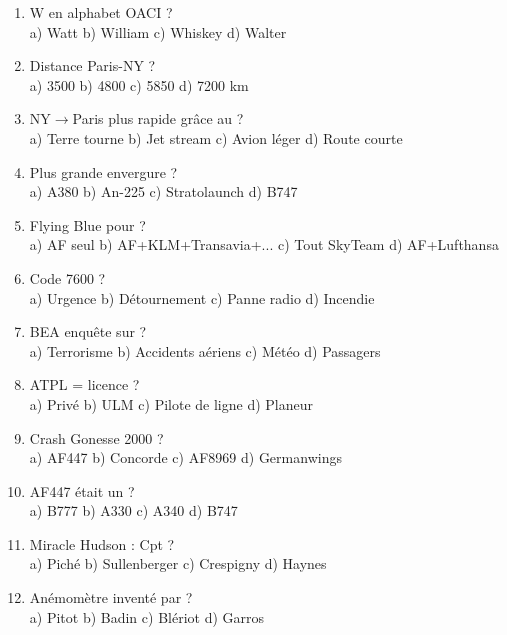 \begin{enumerate}[nosep, start=81]
\item W en alphabet OACI ? \\ a) Watt \quad b) William \quad c) Whiskey \quad d) Walter

\item Distance Paris-NY ? \\ a) 3500 \quad b) 4800 \quad c) 5850 \quad d) 7200 km

\item NY$\to$Paris plus rapide grâce au ? \\ a) Terre tourne \quad b) Jet stream \quad c) Avion léger \quad d) Route courte

\item Plus grande envergure ? \\ a) A380 \quad b) An-225 \quad c) Stratolaunch \quad d) B747

\item Flying Blue pour ? \\ a) AF seul \quad b) AF+KLM+Transavia+... \quad c) Tout SkyTeam \quad d) AF+Lufthansa

\item Code 7600 ? \\ a) Urgence \quad b) Détournement \quad c) Panne radio \quad d) Incendie

\item BEA enquête sur ? \\ a) Terrorisme \quad b) Accidents aériens \quad c) Météo \quad d) Passagers

\item ATPL = licence ? \\ a) Privé \quad b) ULM \quad c) Pilote de ligne \quad d) Planeur

\item Crash Gonesse 2000 ? \\ a) AF447 \quad b) Concorde \quad c) AF8969 \quad d) Germanwings

\item AF447 était un ? \\ a) B777 \quad b) A330 \quad c) A340 \quad d) B747

\item Miracle Hudson : Cpt ? \\ a) Piché \quad b) Sullenberger \quad c) Crespigny \quad d) Haynes

\item Anémomètre inventé par ? \\ a) Pitot \quad b) Badin \quad c) Blériot \quad d) Garros


\end{enumerate}
